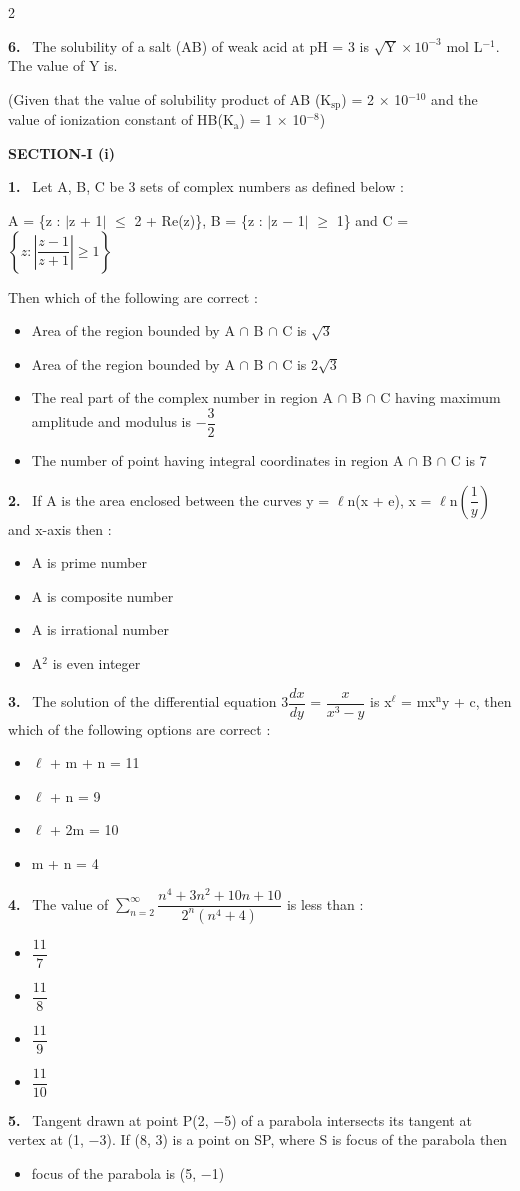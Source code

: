 \documentclass[10pt]{extarticle}
\newcommand{\papersec}[1]{\par\bigskip{\centering\Large\bfseries PAPER-#1\par}\medskip}
\newcommand{\partsec}[2]{\par\medskip\noindent{\large\bfseries PART-#1: #2}\par\smallskip}
\newcommand{\sect}[1]{\par\smallskip\noindent\textbf{#1}\par}
\newcommand{\qn}[1]{\par\smallskip\noindent\textbf{#1.}~}
\newenvironment{qoptions}{\begin{itemize}[leftmargin=1.8em,itemsep=1pt,topsep=2pt,label={}]}{\end{itemize}}
\newcommand{\opt}[2]{\item[(#1)] #2}
\begin{document}
\begin{multicols}{2}
\qn{6} The solubility of a salt (AB) of weak acid at pH = 3 is $\sqrt{\mathrm Y}\times10^{-3}$ mol L$^{-1}$. The value of Y is\underline{\hspace{0.8cm}}.\par
(Given that the value of solubility product of AB (K$_\mathrm{sp}$) = 2 $\times$ 10$^{-10}$ and the value of ionization constant of HB(K$_\mathrm a$) = 1 $\times$ 10$^{-8}$)
\raggedcolumns
\papersec{2}
\partsec{3}{MATHEMATICS}
\sect{SECTION-I (i)}
\qn{1} Let A, B, C be 3 sets of complex numbers as defined below :\par
A = \{z : $|$z + 1$|$ $\le$ 2 + Re(z)\}, B = \{z : $|$z $-$ 1$|$ $\ge$ 1\} and C = $\left\{z:\left|\dfrac{z-1}{z+1}\right|\ge1\right\}$\par
Then which of the following are correct :
\begin{qoptions}
\opt{A}{Area of the region bounded by A $\cap$ B $\cap$ C is $\sqrt3$}
\opt{B}{Area of the region bounded by A $\cap$ B $\cap$ C is 2$\sqrt3$}
\opt{C}{The real part of the complex number in region A $\cap$ B $\cap$ C having maximum amplitude and modulus is $-\dfrac32$}
\opt{D}{The number of point having integral coordinates in region A $\cap$ B $\cap$ C is 7}
\end{qoptions}
\qn{2} If A is the area enclosed between the curves y = $\ell$n(x + e), x = $\ell$n$\left(\dfrac1y\right)$ and x-axis then :
\begin{qoptions}
\opt{A}{A is prime number}
\opt{B}{A is composite number}
\opt{C}{A is irrational number}
\opt{D}{A$^2$ is even integer}
\end{qoptions}
\qn{3} The solution of the differential equation 3$\dfrac{dx}{dy}$ = $\dfrac{x}{x^3-y}$ is x$^\ell$ = mx$^\mathrm n$y + c, then which of the following options are correct :
\begin{qoptions}
\opt{A}{$\ell$ + m + n = 11}
\opt{B}{$\ell$ + n = 9}
\opt{C}{$\ell$ + 2m = 10}
\opt{D}{m + n = 4}
\end{qoptions}
\qn{4} The value of $\displaystyle\sum_{n=2}^{\infty}\dfrac{n^4+3n^2+10n+10}{2^n(n^4+4)}$ is less than :
\begin{qoptions}
\opt{A}{$\dfrac{11}7$}
\opt{B}{$\dfrac{11}8$}
\opt{C}{$\dfrac{11}9$}
\opt{D}{$\dfrac{11}{10}$}
\end{qoptions}
\qn{5} Tangent drawn at point P(2, $-$5) of a parabola intersects its tangent at vertex at (1, $-$3). If (8, 3) is a point on SP, where S is focus of the parabola then
\begin{qoptions}
\opt{A}{focus of the parabola is (5, $-$1)}

\end{qoptions}
\end{multicols}
\end{document}

